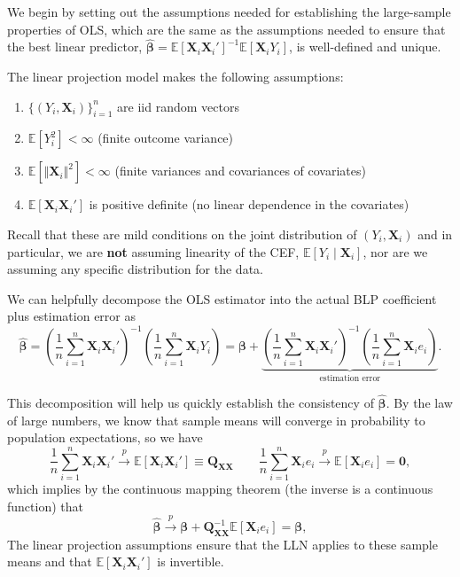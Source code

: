 \documentclass[
  letterpaper,
  DIV=11,
  numbers=noendperiod]{scrreprt}
\newcommand{\mb}{\symbf}
\newcommand{\E}{\mathbb{E}}
\newcommand{\X}{\mb{X}}
\newcommand{\bfbeta}{\mb{\beta}}
\newcommand{\bhat}{\widehat{\mb{\beta}}}
\newcommand{\inprob}{\overset{p}{\to}}
\theoremstyle{plain}
\theoremstyle{definition}
\theoremstyle{definition}
\theoremstyle{remark}
\begin{document}
We begin by setting out the assumptions needed for establishing the
large-sample properties of OLS, which are the same as the assumptions
needed to ensure that the best linear predictor,
\(\bhat = \E[\X_{i}\X_{i}']^{-1}\E[\X_{i}Y_{i}]\), is well-defined and
unique.

\begin{tcolorbox}[enhanced jigsaw, opacityback=0, breakable, bottomtitle=1mm, opacitybacktitle=0.6, coltitle=black, leftrule=.75mm, toptitle=1mm, colback=white, titlerule=0mm, colframe=quarto-callout-note-color-frame, rightrule=.15mm, bottomrule=.15mm, toprule=.15mm, title=\textcolor{quarto-callout-note-color}{\faInfo}\hspace{0.5em}{Linear projection assumptions}, left=2mm, arc=.35mm, colbacktitle=quarto-callout-note-color!10!white]

The linear projection model makes the following assumptions:

\begin{enumerate}
\def\labelenumi{\arabic{enumi}.}
\item
  \(\{(Y_{i}, \X_{i})\}_{i=1}^n\) are iid random vectors
\item
  \(\E[Y^{2}_{i}] < \infty\) (finite outcome variance)
\item
  \(\E[\Vert \X_{i}\Vert^{2}] < \infty\) (finite variances and
  covariances of covariates)
\item
  \(\E[\X_{i}\X_{i}']\) is positive definite (no linear dependence in
  the covariates)
\end{enumerate}

\end{tcolorbox}

Recall that these are mild conditions on the joint distribution of
\((Y_{i}, \X_{i})\) and in particular, we are \textbf{not} assuming
linearity of the CEF, \(\E[Y_{i} \mid \X_{i}]\), nor are we assuming any
specific distribution for the data.

We can helpfully decompose the OLS estimator into the actual BLP
coefficient plus estimation error as \[ 
\bhat = \left( \frac{1}{n} \sum_{i=1}^n \X_i\X_i' \right)^{-1} \left( \frac{1}{n} \sum_{i=1}^n \X_iY_i \right) = \bfbeta + \underbrace{\left( \frac{1}{n} \sum_{i=1}^n \X_i\X_i' \right)^{-1} \left( \frac{1}{n} \sum_{i=1}^n \X_ie_i \right)}_{\text{estimation error}}.
\]

This decomposition will help us quickly establish the consistency of
\(\bhat\). By the law of large numbers, we know that sample means will
converge in probability to population expectations, so we have \[ 
\frac{1}{n} \sum_{i=1}^n \X_i\X_i' \inprob \E[\X_i\X_i'] \equiv \mb{Q}_{\X\X} \qquad \frac{1}{n} \sum_{i=1}^n \X_ie_i \inprob \E[\X_{i} e_{i}] = \mb{0},
\] which implies by the continuous mapping theorem (the inverse is a
continuous function) that \[
\bhat \inprob \bfbeta + \mb{Q}_{\X\X}^{-1}\E[\X_ie_i] = \bfbeta,
\] The linear projection assumptions ensure that the LLN applies to
these sample means and that \(\E[\X_{i}\X_{i}']\) is invertible.
\end{document}
